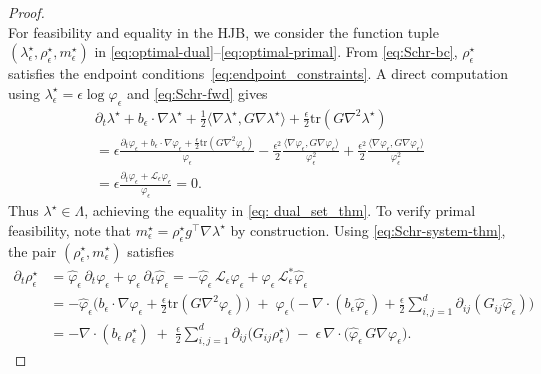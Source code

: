\documentclass[10pt,a4paper]{amsart}
\newcommand{\tr}{\mathrm{tr}}
\begin{document}
\begin{proof}
\begin{equation}
\end{equation}
For feasibility and equality in the HJB, we consider the function tuple $(\lambda_{\epsilon}^\star,\rho_{\epsilon}^\star,m_{\epsilon}^\star)$ in \eqref{eq:optimal-dual}--\eqref{eq:optimal-primal}. From \eqref{eq:Schr-bc}, $\rho_{\epsilon}^\star$ satisfies the endpoint conditions~\eqref{eq:endpoint_constraints}. A direct computation using $\lambda_{\epsilon}^\star=\epsilon\log\varphi_{\epsilon}$ and \eqref{eq:Schr-fwd} gives
\begin{multline*}
\partial_t\lambda^\star+b_\epsilon\cdot\nabla\lambda^\star
+\tfrac12\langle\nabla\lambda^\star,G\nabla\lambda^\star\rangle
+\tfrac{\epsilon}{2}\tr(G\nabla^2\lambda^\star) \\
= \epsilon\frac{\partial_t\varphi_{\epsilon}+b_\epsilon\cdot\nabla\varphi_{\epsilon}+\tfrac{\epsilon}{2}\tr(G\nabla^2\varphi_{\epsilon})}{\varphi_{\epsilon}}
-\tfrac{\epsilon^2}{2}\frac{\langle\nabla\varphi_{\epsilon},G\nabla\varphi_{\epsilon}\rangle}{\varphi_{\epsilon}^2}
+\tfrac{\epsilon^2}{2}\frac{\langle\nabla\varphi_{\epsilon},G\nabla\varphi_{\epsilon}\rangle}{\varphi_{\epsilon}^2}
\\= \epsilon\frac{\partial_t\varphi_{\epsilon}+\mathcal L_\epsilon\varphi_{\epsilon}}{\varphi_{\epsilon}}=0.
\end{multline*}
Thus $\lambda^\star\in\Lambda$, achieving the equality in \eqref{eq: dual_set_thm}. To verify primal feasibility, note that $m_{\epsilon}^\star=\rho_{\epsilon}^\star g^\top\nabla\lambda^\star$ by construction. Using \eqref{eq:Schr-system-thm}, the pair $(\rho_{\epsilon}^\star,m_{\epsilon}^\star)$ satisfies
\begin{align*}
\partial_t\rho_{\epsilon}^\star
&= \hat\varphi_{\epsilon}\,\partial_t\varphi_{\epsilon} + \varphi_{\epsilon}\,\partial_t\hat\varphi_{\epsilon}
= -\hat\varphi_{\epsilon}\,\mathcal L_\epsilon\varphi_{\epsilon} + \varphi_{\epsilon}\,\mathcal L_\epsilon^\ast\hat\varphi_{\epsilon} \\
&= -\hat\varphi_{\epsilon}\Big(b_\epsilon\cdot\nabla\varphi_{\epsilon} + \frac{\epsilon}{2}\tr(G\nabla^2\varphi_{\epsilon})\Big)
\;+\;\varphi_{\epsilon}\Big(-\nabla\!\cdot(b_\epsilon\hat\varphi_{\epsilon})+\frac{\epsilon}{2}\sum_{i,j=1}^d\partial_{ij}(G_{ij}\hat\varphi_{\epsilon})\Big) \\
&= -\nabla\!\cdot(b_\epsilon\,\rho_{\epsilon}^\star)
\;+\;\frac{\epsilon}{2}\sum_{i,j=1}^d \partial_{ij}\!\big(G_{ij}\rho_{\epsilon}^\star\big)
\;-\;\epsilon\,\nabla\!\cdot\!\big(\hat\varphi_{\epsilon}\,G\nabla\varphi_{\epsilon}\big).

\end{align*}
\end{proof}
\end{document}
